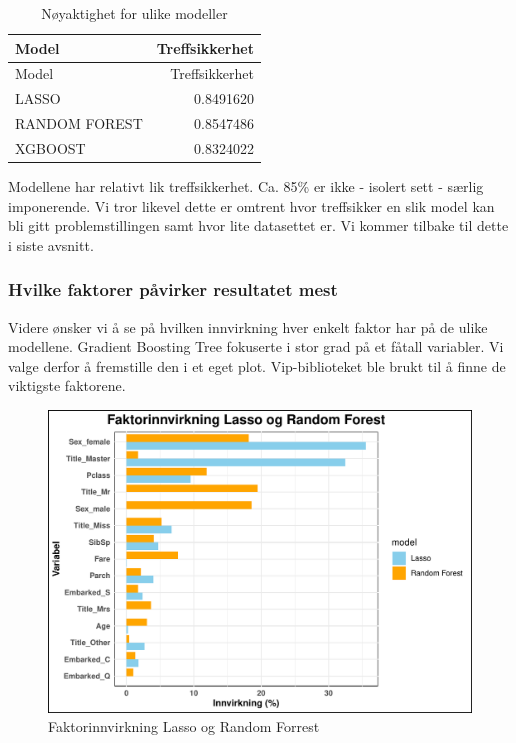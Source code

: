 \documentclass[
]{article}
\begin{document}
\begin{longtable}[]{@{}lr@{}}
\caption{Nøyaktighet for ulike modeller}\tabularnewline
\toprule\noalign{}
Model & Treffsikkerhet \\
\midrule\noalign{}
\endfirsthead
\toprule\noalign{}
Model & Treffsikkerhet \\
\midrule\noalign{}
\endhead
\bottomrule\noalign{}
\endlastfoot
LASSO & 0.8491620 \\
RANDOM FOREST & 0.8547486 \\
XGBOOST & 0.8324022 \\
\end{longtable}

Modellene har relativt lik treffsikkerhet. Ca. 85\% er ikke - isolert
sett - særlig imponerende. Vi tror likevel dette er omtrent hvor
treffsikker en slik model kan bli gitt problemstillingen samt hvor lite
datasettet er. Vi kommer tilbake til dette i siste avsnitt.

\subsubsection{Hvilke faktorer påvirker resultatet
mest}\label{hvilke-faktorer-puxe5virker-resultatet-mest}

Videre ønsker vi å se på hvilken innvirkning hver enkelt faktor har på
de ulike modellene. Gradient Boosting Tree fokuserte i stor grad på et
fåtall variabler. Vi valge derfor å fremstille den i et eget plot.
Vip-biblioteket ble brukt til å finne de viktigste faktorene.

\begin{figure}[H]

{\centering \includegraphics[width=0.8\linewidth]{presentation_files/figure-latex/unnamed-chunk-11-1} 

}

\caption{Faktorinnvirkning Lasso og Random Forrest}\label{fig:unnamed-chunk-11}
\end{figure}
\end{document}
